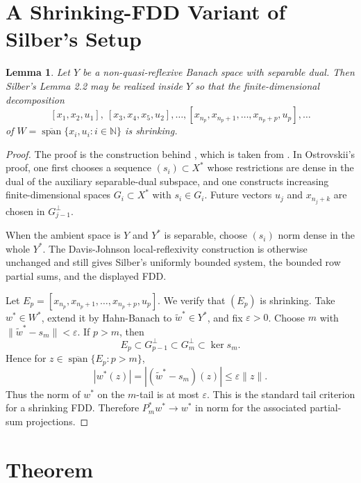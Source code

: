 \documentclass[11pt]{article}
\newtheorem{lemma}{Lemma}
\newcommand{\N}{\mathbb{N}}
\begin{document}
\section*{A Shrinking-FDD Variant of Silber's Setup}

\begin{lemma}\label{lem:shrinking-fdd-setup}
Let \(Y\) be a non-quasi-reflexive Banach space with separable dual.  Then
Silber's Lemma 2.2 may be realized inside \(Y\) so that the finite-dimensional
decomposition
\[
  [x_1,x_2,u_1],\ [x_3,x_4,x_5,u_2],\ldots,
  [x_{n_p},x_{n_p+1},\ldots,x_{n_p+p},u_p],\ldots
\]
of \(W=\overline{\operatorname{span}}\{x_i,u_i:i\in\N\}\) is shrinking.
\end{lemma}

\begin{proof}
The proof is the construction behind \cite[Lemma 2.2]{Silber2022}, which is
taken from \cite[Lemma 2]{Ostrovskii2011}.  In Ostrovskii's proof, one first
chooses a sequence \((s_i)\subset X^*\) whose restrictions are dense in the
dual of the auxiliary separable-dual subspace, and one constructs increasing
finite-dimensional spaces \(G_i\subset X^*\) with \(s_i\in G_i\).  Future
vectors \(u_j\) and \(x_{n_j+k}\) are chosen in \(G_{j-1}^{\perp}\).

When the ambient space is \(Y\) and \(Y^*\) is separable, choose \((s_i)\) norm
dense in the whole \(Y^*\).  The Davis-Johnson local-reflexivity construction
is otherwise unchanged and still gives Silber's uniformly bounded system, the
bounded row partial sums, and the displayed FDD.

Let \(E_p=[x_{n_p},x_{n_p+1},\ldots,x_{n_p+p},u_p]\).  We verify that
\((E_p)\) is shrinking.  Take \(w^*\in W^*\), extend it by Hahn-Banach to
\(\widetilde w^*\in Y^*\), and fix \(\varepsilon>0\).  Choose \(m\) with
\(\|\widetilde w^*-s_m\|<\varepsilon\).  If \(p>m\), then
\[
  E_p\subset G_{p-1}^{\perp}\subset G_m^{\perp}\subset \ker s_m .
\]
Hence for \(z\in \overline{\operatorname{span}}\{E_p:p>m\}\),
\[
  |w^*(z)|=|(\widetilde w^*-s_m)(z)|\leq \varepsilon\|z\|.
\]
Thus the norm of \(w^*\) on the \(m\)-tail is at most \(\varepsilon\).  This is
the standard tail criterion for a shrinking FDD.  Therefore \(P_m^*w^*\to w^*\)
in norm for the associated partial-sum projections.
\end{proof}

\section*{Theorem}
\end{document}
